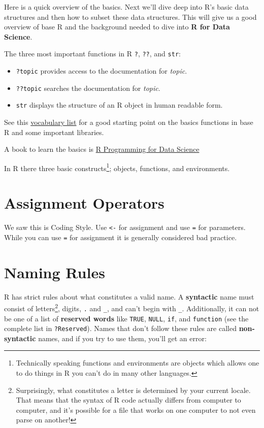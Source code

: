 \documentclass[]{book}
\providecommand{\tightlist}{%
  \setlength{\itemsep}{0pt}\setlength{\parskip}{0pt}}
\let\rmarkdownfootnote\footnote%
\def\footnote{\protect\rmarkdownfootnote}
\theoremstyle{definition}
\theoremstyle{definition}
\theoremstyle{definition}
\theoremstyle{remark}
\begin{document}
Here is a quick overview of the basics. Next we'll dive deep into R's
basic data structures and then how to subset these data structures. This
will give us a good overview of base R and the background needed to dive
into \textbf{R for Data Science}.

The three most important functions in R \texttt{?}, \texttt{??}, and
\texttt{str}:

\begin{itemize}
\tightlist
\item
  \texttt{?topic} provides access to the documentation for \emph{topic}.
\item
  \texttt{??topic} searches the documentation for \emph{topic}.
\item
  \texttt{str} displays the structure of an R object in human readable
  form.
\end{itemize}

See this \href{http://adv-r.had.co.nz/Vocabulary.html}{vocabulary list}
for a good starting point on the basics functions in base R and some
important libraries.

A book to learn the basics is
\href{https://bookdown.org/rdpeng/rprogdatascience/}{R Programming for
Data Science}

In R there three basic constructs\footnote{Technically speaking
  functions and environments are objects which allows one to do things
  in R you can't do in many other languages.}; objects, functions, and
environments.

\hypertarget{assignment-operators}{%
\section{Assignment Operators}\label{assignment-operators}}

We saw this is Coding Style. Use \texttt{\textless{}-} for assignment
and use \texttt{=} for parameters. While you can use \texttt{=} for
assignment it is generally considered bad practice.

\hypertarget{naming-rules}{%
\section{Naming Rules}\label{naming-rules}}

R has strict rules about what constitutes a valid name. A
\textbf{syntactic} name must consist of letters\footnote{Surprisingly,
  what constitutes a letter is determined by your current locale. That
  means that the syntax of R code actually differs from computer to
  computer, and it's possible for a file that works on one computer to
  not even parse on another!}, digits, \texttt{.} and \texttt{\_}, and
can't begin with \texttt{\_}. Additionally, it can not be one of a list
of \textbf{reserved words} like \texttt{TRUE}, \texttt{NULL},
\texttt{if}, and \texttt{function} (see the complete list in
\texttt{?Reserved}). Names that don't follow these rules are called
\textbf{non-syntactic} names, and if you try to use them, you'll get an
error:
\end{document}
